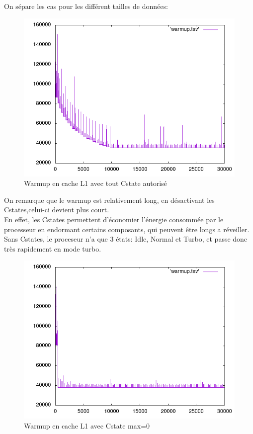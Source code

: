 \documentclass{report}
\begin{document}
On sépare les cas pour les différent tailles de données:
\newpage
    \begin{figure}[ht!]
        \centering
        \includegraphics[width=120mm]{MEDIA/warmupL1_Cstate.png}
        \caption{Warmup en cache L1 avec tout Cstate autorisé}
    \end{figure}

On remarque que le warmup est relativement long, en désactivant les Cstates,celui-ci devient plus court.\\

En effet, les Cstates permettent d'économier l'énergie consommée par le processeur en endormant certains composants, qui peuvent être longs a réveiller.\\

Sans Cstates, le proceseur n'a que 3 états: Idle, Normal et Turbo, et passe donc très rapidement en mode turbo.\\
\newpage
    \begin{figure}[ht!]
        \centering
        \includegraphics[width=120mm]{MEDIA/warmupL1_NOCstate.png}
        \caption{Warmup en cache L1 avec Cstate max=0}
    \end{figure}
\end{document}
